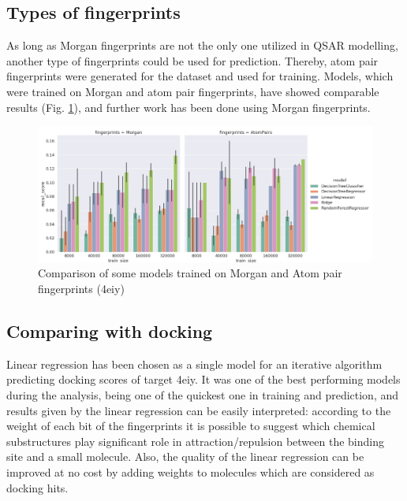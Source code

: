 \hfill\break
\subsection{Types of fingerprints}

As long as Morgan fingerprints are not the only one utilized in QSAR modelling, another type of fingerprints could be used for prediction. 
Thereby, atom pair fingerprints were generated for the dataset and used for training. 
Models, which were trained on Morgan and atom pair fingerprints, have showed comparable results (Fig. \ref{MvsAP}), and further work has been done using Morgan fingerprints.

\begin{figure}[H]
    \centering
    \includegraphics[width=\linewidth]{Images/MorganVSAtomPairs.jpg}
    \caption{Comparison of some models trained on Morgan and Atom pair fingerprints (4eiy)}
    \label{MvsAP}
\end{figure}



\hfill\break
\subsection{Comparing with docking}

Linear regression has been chosen as a single model for an iterative algorithm predicting docking scores of target 4eiy. 
It was one of the best performing models during the analysis, being one of the quickest one in training and prediction, and results given by the linear regression can be easily interpreted: according to the weight of each bit of the fingerprints it is possible to suggest which chemical substructures play significant role in attraction/repulsion between the binding site and a small molecule. 
Also, the quality of the linear regression can be improved at no cost by adding weights to molecules which are considered as docking hits.\\

